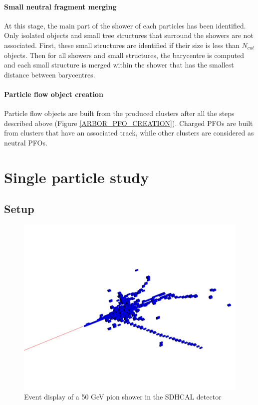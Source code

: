 \documentclass[cits]{JINST}
\begin{document}
\paragraph*{Small neutral fragment merging} At this stage, the main part of the shower of each particles has been identified. Only isolated objects and small tree structures that surround the showers are not associated. First, these small structures are identified if their size is less than $N_{cut}$ objects. Then for all showers and small structures, the barycentre is computed and each small structure is merged within the shower that has the smallest distance between barycentres.

\paragraph*{Particle flow object creation} Particle flow objects are built from the produced clusters after all the steps described above (Figure \ref{ARBOR_PFO_CREATION}). Charged PFOs are built from clusters that have an associated track, while other clusters are considered as neutral PFOs.

\newpage
\section{Single particle study}
\label{SINGLE_PARTICLE_STUDY_SECTION}

\subsection{Setup}

\begin{figure}
  \vspace{-20pt}
  \begin{center}
    \includegraphics[width=\linewidth]{SingleParticleSetup.pdf}
  \end{center}
  \vspace{-10pt}
  \caption{\label{ARBOR_SINGLE_PARTICLE_SETUP} Event display of a 50 GeV pion shower in the SDHCAL detector}
\end{figure}
\end{document}
